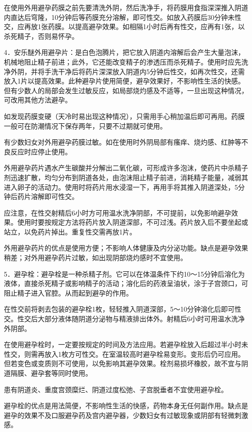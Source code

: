 \documentclass[12pt,UTF8]{ctexbook}
\begin{document}
在使用外用避孕药膜之前先要清洗外阴，然后洗净手，将药膜用食指深深推入阴道内直达后穹隆，10分钟后等药膜充分溶解，即可性交。如放入药膜后30分钟未性交，应再放1张药膜。以提高避孕效果。如相隔1小时后再有性交，应再有1张，以杀死精子，否则易怀孕。

4．安乐醚外用避孕片：是白色泡腾片，把它放入阴道内溶解后会产生大量泡沫，机械地阻止精子前进；此外，它还能改变精子的渗透压而杀死精子。使用时应先洗净外阴，并将手洗干净后将药片深深放入阴道内5分钟后性交，如再次性交，还需放入1片以提高效果。此种避孕片使用简便，避孕效果好，不影响性生活的快感。但有少数人的局部会发生过敏反应，如局部烧灼感及不适等，一旦出现这种情况，可改用其他方法避孕。

如发现药膜变硬（天冷时易出现这种情况），只需用手心稍加温后即可再用。药膜一般可在防潮情况下保存两年，只要不过期就可使用。

有少数妇女对外用避孕药膜过敏。如在使用时外阴局部有瘙痒、烧灼感、红肿等不良反应时应停止使用。

外用避孕药片遇水产生碳酸并分解出二氧化碳，可形成许多泡沫，使药片中杀精子剂迅速扩散，均匀分布到阴道各处，由泡沫阻止精子前进，消耗精子能量，减弱其进入卵子的活动力。使用时将药片用水浸湿一下，再用手将其推入阴道深处，5分钟后药片溶解即可性交。

应注意，在性交射精后6小时方可用温水洗净阴部，不可提前，以免影响避孕效果。使用时要按规定方法将药片放入阴道深部，不可过浅。药片放入后不要坐起或站立，以免药片掉出。重复性交需再放1片。

外用避孕药片的优点是使用方便；不影响人体健康及内分泌功能。缺点是避孕效果稍差；对外用避孕药片过敏，如出现阴部烧灼感时不宜使用。

5．避孕栓：避孕栓是一种杀精子剂。它可以在体温条件下约10～15分钟后溶化为液体，直接杀死精子或影响精子的活动；溶化后的药液呈油状，涂于子宫颈口，可阻止精子进入官腔。从而起到避孕的作用。

在性交前将剥去包装的避孕栓1枚，轻轻推入阴道深部，5～10分钟溶化后即可性交。性交后大部分液体随阴道分泌物与精液排出体外。射精后6小时可用温水洗净外阴部。

在使用避孕栓时，一定要按规定的时间及方法应用。若避孕栓放入后超过半小时未性交，则需再放入1枚方可性交。在室温较高时避孕栓易变形。变形后仍可应用。但若变色或变质则不可使用，以免影响其避孕效果。栓剂易损坏橡胶，故不宜与阴道隔膜、避孕套等同时使用。

患有阴道炎、重度宫颈糜烂、阴道过度松弛、子宫脱垂者不宜使用避孕栓。

避孕栓的优点是用法简便，不影响性生活的快感，药物本身无任何副作用。缺点是避孕的效果不及口服避孕药及宫内避孕器，少数妇女有过敏现象或阴部有轻微刺激感。
\end{document}
